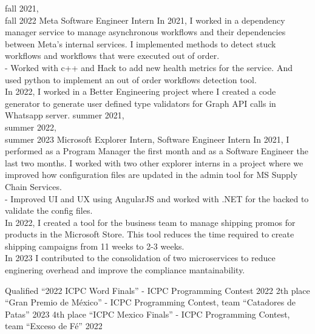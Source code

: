 \documentclass[9pt]{developercv} %
\begin{document}
\begin{entrylist}
    \entry
        {fall 2021,\\fall 2022}
        {Meta}
        {Software Engineer Intern}
        {In 2021, I worked in a dependency manager service to manage asynchronous workflows and their dependencies between Meta's internal services. I implemented methods to detect stuck workflows and workflows that were executed out of order.\\
		- Worked with c++ and Hack to add new health metrics for the service. And used python to implement an out of order workflows detection tool.\\
        In 2022, I worked in a Better Engineering project where I created a code generator to generate user defined type validators for Graph API calls in Whatsapp server.}
	\entry
		{summer 2021,\\summer 2022,\\summer 2023}
		{Microsoft}
		{Explorer Intern, Software Engineer Intern}
		{In 2021, I performed as a Program Manager the first month and as a Software Engineer the last two months. I worked with two other explorer interns in a project where we improved how configuration files are updated in the admin tool for MS Supply Chain Services.\\
		- Improved UI and UX using AngularJS and worked with .NET for the backed to validate the config files.\\
        In 2022, I created a tool for the business team to manage shipping promos for products in the Microsoft Store. This tool reduces the time required to create shipping campaigns from 11 weeks to 2-3 weeks.\\
		In 2023 I contributed to the consolidation of two microservices to reduce enginering overhead and improve the compliance mantainability.}
\end{entrylist}



\begin{entrylist}
	\entry
		{Qualified}
		{``2022 ICPC Word Finals'' - ICPC Programming Contest}
		{2022}
		{}
	\entry
		{2th place}
		{``Gran Premio de México'' - ICPC Programming Contest, team ``Catadores de Patas''}
		{2023}
		{}
	\entry
		{4th place}
		{``ICPC Mexico Finals'' - ICPC Programming Contest, team ``Exceso de Fé''}
		{2022}
		{}
\end{entrylist}
\end{document}
